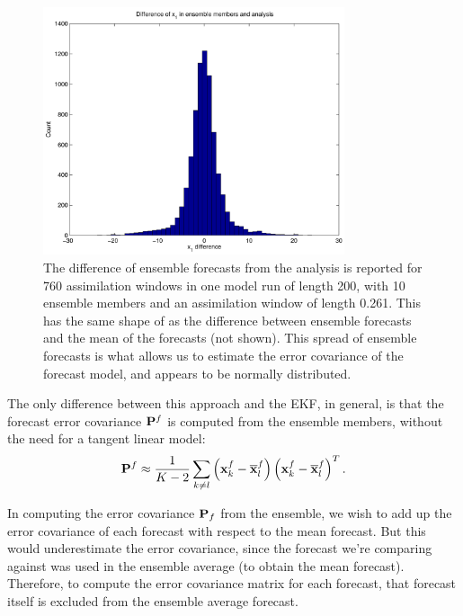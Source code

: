 \documentclass[12pt]{report}
\begin{document}
\begin{figure}[h!]
  \centering
  \includegraphics[width=0.79\textwidth]{figures/EnKF-histogram-analysis.pdf}
  \caption[The difference of ensemble forecasts from the analysis is reported for 760 assimilation windows in one model run of length 200, with 10 ensemble members and an assimilation window of length 0.261]{
    The difference of ensemble forecasts from the analysis is reported for 760 assimilation windows in one model run of length 200, with 10 ensemble members and an assimilation window of length 0.261.
    This has the same shape of as the difference between ensemble forecasts and the mean of the forecasts (not shown).
    This spread of ensemble forecasts is what allows us to estimate the error covariance of the forecast model, and appears to be normally distributed.
  }
  \label{fig:EnKFhist}
\end{figure}

The only difference between this approach and the EKF, in general, is that the forecast error covariance $\mathbf{P}^f$ is computed from the ensemble members, without the need for a tangent linear model:
\[ \mathbf{P}^f \approx \frac{1}{K-2} \sum _{k\neq l} \left ( \mathbf{x}_k ^f - \overline{\mathbf{x}} ^f _l \right ) \left (\mathbf{x}_k ^f - \overline{\mathbf{x}} ^f _l \right ) ^T .\]

In computing the error covariance $\mathbf{P}_f$ from the ensemble, we wish to add up the error covariance of each forecast with respect to the mean forecast. 
But this would underestimate the error covariance, since the forecast we're comparing against was used in the ensemble average (to obtain the mean forecast).
Therefore, to compute the error covariance matrix for each forecast, that forecast itself is excluded from the ensemble average forecast.
\end{document}
